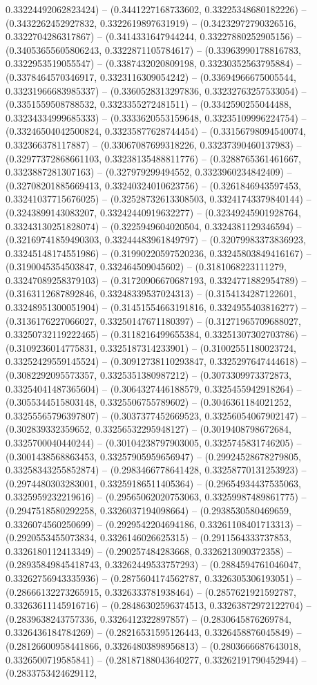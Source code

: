 0.33224492062823424) -- (0.3441227168733602, 0.33225348680182226) -- (0.3432262452927832, 0.3322619897631919) -- (0.34232972790326516, 0.3322704286317867) -- (0.3414331647944244, 0.33227880252905156) -- (0.34053655605806243, 0.3322871105784617) -- (0.33963990178816783, 0.3322953519055547) -- (0.3387432020809198, 0.33230352563795884) -- (0.3378464570346917, 0.3323116309054242) -- (0.33694966675005544, 0.33231966683985337) -- (0.3360528313297836, 0.33232763257533054) -- (0.3351559508788532, 0.3323355272481511) -- (0.3342590255044488, 0.33234334999685333) -- (0.3333620553159648, 0.33235109996224754) -- (0.33246504042500824, 0.33235877628744454) -- (0.33156798094540074, 0.332366378117887) -- (0.33067087699318226, 0.33237390460137983) -- (0.32977372868661103, 0.33238135488811776) -- (0.3288765361461667, 0.3323887281307163) -- (0.327979299494552, 0.3323960234842409) -- (0.32708201885669413, 0.33240324010623756) -- (0.3261846943597453, 0.33241037715676025) -- (0.32528732613308503, 0.33241743379840144) -- (0.3243899143083207, 0.33242440919632277) -- (0.32349245901928764, 0.33243130251828074) -- (0.3225949604020504, 0.3324381129346594) -- (0.32169741859490303, 0.33244483961849797) -- (0.32079983373836923, 0.33245148174551986) -- (0.31990220597520236, 0.33245803849416167) -- (0.3190045354503847, 0.332464509045602) -- (0.3181068223111279, 0.33247089258379103) -- (0.31720906670687193, 0.3324771882954789) -- (0.3163112687892846, 0.33248339537024313) -- (0.3154134287122601, 0.33248951300051904) -- (0.31451554663191816, 0.3324955403816277) -- (0.3136176227066027, 0.33250147671180397) -- (0.31271965709688027, 0.33250732119222465) -- (0.3118216499655384, 0.33251307302703786) -- (0.3109236014775831, 0.3325187314233901) -- (0.31002551180023724, 0.33252429559145524) -- (0.30912738110293847, 0.3325297647444618) -- (0.3082292095573357, 0.3325351380987212) -- (0.3073309973372873, 0.33254041487365604) -- (0.3064327446188579, 0.3325455942918264) -- (0.3055344515803148, 0.3325506755789602) -- (0.3046361184021252, 0.33255565796397807) -- (0.3037377452669523, 0.33256054067902147) -- (0.302839332359652, 0.33256532295948127) -- (0.3019408798672684, 0.3325700040440244) -- (0.30104238797903005, 0.3325745831746205) -- (0.3001438568863453, 0.33257905959656947) -- (0.29924528678279805, 0.33258343255852874) -- (0.2983466778641428, 0.33258770131253923) -- (0.2974480303283001, 0.33259186511405364) -- (0.29654934437535063, 0.3325959232219616) -- (0.29565062020753063, 0.33259987489861775) -- (0.2947518580292258, 0.3326037194098664) -- (0.2938530580469659, 0.3326074560250699) -- (0.2929542204694186, 0.33261108401713313) -- (0.2920553455073834, 0.3326146026625315) -- (0.2911564333737853, 0.3326180112413349) -- (0.290257484283668, 0.3326213090372358) -- (0.28935849845418743, 0.33262449533757293) -- (0.2884594761046047, 0.33262756943335936) -- (0.2875604174562787, 0.3326305306193051) -- (0.28666132273265915, 0.3326333781938464) -- (0.2857621921592787, 0.33263611145916716) -- (0.28486302596374513, 0.33263872972122704) -- (0.2839638243757336, 0.3326412322897857) -- (0.2830645876269784, 0.3326436184784269) -- (0.28216531595126443, 0.3326458876045849) -- (0.28126600958441866, 0.33264803898956813) -- (0.2803666687643018, 0.3326500719585841) -- (0.28187188043640277, 0.33262191790452944) -- (0.2833753424629112, 